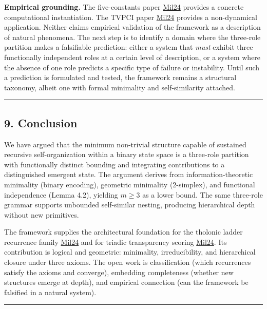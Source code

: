 \documentclass[
  11pt,
  letterpaper,
]{article}
\begin{document}
\textbf{Empirical grounding.} The five-constants paper
\href{https://tholonia.github.io/the-book/}{Mil24} provides a concrete
computational instantiation. The TVPCI paper
\href{https://tholonia.github.io/the-book/}{Mil24} provides a
non-dynamical application. Neither claims empirical validation of the
framework as a description of natural phenomena. The next step is to
identify a domain where the three-role partition makes a falsifiable
prediction: either a system that \emph{must} exhibit three functionally
independent roles at a certain level of description, or a system where
the absence of one role predicts a specific type of failure or
instability. Until such a prediction is formulated and tested, the
framework remains a structural taxonomy, albeit one with formal
minimality and self-similarity attached.

\begin{center}\rule{0.5\linewidth}{0.5pt}\end{center}

\subsection{9. Conclusion}\label{conclusion}

We have argued that the minimum non-trivial structure capable of
sustained recursive self-organization within a binary state space is a
three-role partition with functionally distinct bounding and integrating
contributions to a distinguished emergent state. The argument derives
from information-theoretic minimality (binary encoding), geometric
minimality (2-simplex), and functional independence (Lemma 4.2),
yielding \(m \ge 3\) as a lower bound. The same three-role grammar
supports unbounded self-similar nesting, producing hierarchical depth
without new primitives.

The framework supplies the architectural foundation for the tholonic
ladder recurrence family
\href{https://tholonia.github.io/the-book/}{Mil24} and for triadic
transparency scoring \href{https://tholonia.github.io/the-book/}{Mil24}.
Its contribution is logical and geometric: minimality, irreducibility,
and hierarchical closure under three axioms. The open work is
classification (which recurrences satisfy the axioms and converge),
embedding completeness (whether new structures emerge at depth), and
empirical connection (can the framework be falsified in a natural
system).

\begin{center}\rule{0.5\linewidth}{0.5pt}\end{center}
\end{document}
